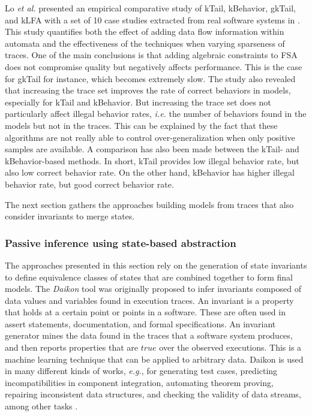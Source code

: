 Lo \emph{et al.} presented an empirical comparative study of kTail,
kBehavior, gkTail, and kLFA with a set of 10 case studies
extracted from real software systems in \cite{Lo20122063}. This
study quantifies both the effect of adding data flow information
within automata and the effectiveness of the techniques when
varying sparseness of traces. One of the main conclusions is that
adding algebraic constraints to FSA does not compromise quality
but negatively affects performance. This is the case for gkTail
for instance, which becomes extremely slow. The study also
revealed that increasing the trace set improves the rate of
correct behaviors in models, especially for kTail and kBehavior.
But increasing the trace set does not particularly affect illegal
behavior rates, \emph{i.e.} the number of behaviors found in the models
but not in the traces. This can be explained by the fact that
these algorithms are not really able to control
over-generalization when only positive samples are available. A
comparison has also been made between the kTail- and
kBehavior-based methods. In short, kTail provides low illegal
behavior rate, but also low correct behavior rate. On the other
hand, kBehavior has higher illegal behavior rate, but good
correct behavior rate.

The next section gathers the approaches building models from
traces that also consider invariants to merge states.

\subsubsection{Passive inference using state-based abstraction}
\label{sec:passive-spec}

The approaches presented in this section rely on the generation
of state invariants to define equivalence classes of states that
are combined together to form final models. The \textit{Daikon}
tool \cite{Ernst:1999:DDL:302405.302467} was originally proposed
to infer invariants composed of data values and variables found
in execution traces. An invariant is a property that holds at a
certain point or points in a software. These are often used in
assert statements, documentation, and formal specifications. An
invariant generator mines the data found in the traces that a
software system produces, and then reports properties that are
$true$ over the observed executions.  This is a machine learning
technique that can be applied to arbitrary data. Daikon is used
in many different kinds of works, \emph{e.g.}, for generating test cases,
predicting incompatibilities in component integration, automating
theorem proving, repairing inconsistent data structures, and
checking the validity of data streams, among other tasks
\cite{Ernst200735}.


